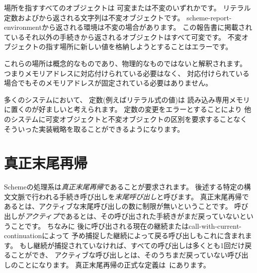 場所を指すすべてのオブジェクトは
可変または不変のいずれかです。
リテラル定数およびから返される文字列は不変オブジェクトです。
{\cf scheme-\+report-\+environment}から返される環境は不変の場合があります。
この報告書に掲載されているそれ以外の手続きから返されるオブジェクトはすべて可変です。
不変オブジェクトの指す場所に新しい値を格納しようとすることはエラーです。


これらの場所は概念的なものであり、物理的なものではないと解釈されます。
つまりメモリアドレスに対応付けられている必要はなく、
対応付けられている場合でもそのメモリアドレスが固定されている必要はありません。

\begin{rationale}
多くのシステムにおいて、
定数(例えばリテラル式の値)は
読み込み専用メモリに置くのが好ましいと考えられます。
定数の変更をエラーとすることにより
他のシステムに可変オブジェクトと不変オブジェクトの区別を要求することなく
そういった実装戦略を取ることができるようになります。
\end{rationale}

\section{真正末尾再帰}
\label{proper tail recursion}

Schemeの処理系は{\em 真正末尾再帰}であることが要求されます。
後述する特定の構文文脈で行われる手続き呼び出しを{\em 末尾呼び出し}と呼びます。
真正末尾再帰であるとは、アクティブな末尾呼び出しの数に制限が無いということです。
呼び出しが{\em アクティブ}であるとは、その呼び出された手続きがまだ戻っていないということです。
ちなみに
後に呼び出される現在の継続または{\cf call-with-current-continuation}によって
予め捕捉した継続によって戻る呼び出しもこれに含まれます。
もし継続が捕捉されていなければ、すべての呼び出しは多くとも1回だけ戻ることができ、
アクティブな呼び出しとは、そのうちまだ戻っていない呼び出しのことになります。
真正末尾再帰の正式な定義は\cite{propertailrecursion}~にあります。

